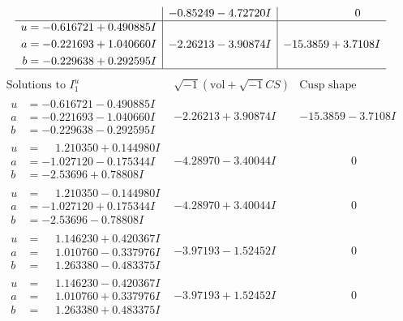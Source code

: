 \documentclass[1p]{elsarticle_modified}
\theoremstyle{definition}
\newcommand{\I}{\sqrt{-1}}
\begin{document}
$$\begin{array}{c|c|c}
 & -0.85249 - 4.72720 I & \phantom{-0.000000 } 0 \\ \hline\begin{aligned}
u &= -0.616721 + 0.490885 I \\
a &= -0.221693 + 1.040660 I \\
b &= -0.229638 + 0.292595 I\end{aligned}
 & -2.26213 - 3.90874 I & -15.3859 + 3.7108 I\\
 \hline 
 \end{array}$$\newpage$$\begin{array}{c|c|c}  
\text{Solutions to }I^u_{1}& \I (\text{vol} + \sqrt{-1}CS) & \text{Cusp shape}\\
 \hline 
\begin{aligned}
u &= -0.616721 - 0.490885 I \\
a &= -0.221693 - 1.040660 I \\
b &= -0.229638 - 0.292595 I\end{aligned}
 & -2.26213 + 3.90874 I & -15.3859 - 3.7108 I \\ \hline\begin{aligned}
u &= \phantom{-}1.210350 + 0.144980 I \\
a &= -1.027120 - 0.175344 I \\
b &= -2.53696 + 0.78808 I\end{aligned}
 & -4.28970 - 3.40044 I & \phantom{-0.000000 } 0 \\ \hline\begin{aligned}
u &= \phantom{-}1.210350 - 0.144980 I \\
a &= -1.027120 + 0.175344 I \\
b &= -2.53696 - 0.78808 I\end{aligned}
 & -4.28970 + 3.40044 I & \phantom{-0.000000 } 0 \\ \hline\begin{aligned}
u &= \phantom{-}1.146230 + 0.420367 I \\
a &= \phantom{-}1.010760 - 0.337976 I \\
b &= \phantom{-}1.263380 - 0.483375 I\end{aligned}
 & -3.97193 - 1.52452 I & \phantom{-0.000000 } 0 \\ \hline\begin{aligned}
u &= \phantom{-}1.146230 - 0.420367 I \\
a &= \phantom{-}1.010760 + 0.337976 I \\
b &= \phantom{-}1.263380 + 0.483375 I\end{aligned}
 & -3.97193 + 1.52452 I & \phantom{-0.000000 } 0 \\ \hline\begin{aligned}

\end{aligned}
\end{array}$$
\end{document}
